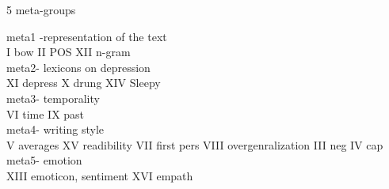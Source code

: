 5 meta-groups

meta1 -representation of the text\\
I bow
II POS
XII n-gram\\

meta2- lexicons on depression\\
XI depress 
X drung 
XIV Sleepy\\

meta3- temporality\\
VI time
IX past\\

meta4- writing style  \\
V averages
XV readibility
VII first pers
VIII overgenralization
III neg
IV cap\\

meta5- emotion \\
XIII emoticon, sentiment
XVI empath

